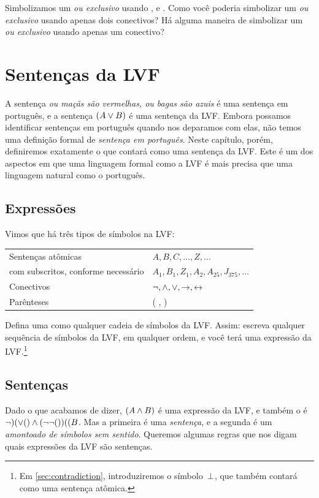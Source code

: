 \problempart
Simbolizamos um \emph{ou exclusivo} usando \eor, \eand e \enot. Como você poderia simbolizar um \emph{ou exclusivo} usando apenas dois conectivos? Há alguma maneira de simbolizar um \emph{ou exclusivo} usando apenas um conectivo?

\chapter{Sentenças da LVF}\label{s:TFLSentences}
A sentença \emph{ou maçãs são vermelhas, ou bagas são azuis} é uma
sentença em português, e a sentença $(A\vee B)$ é uma sentença da LVF.
Embora possamos identificar sentenças em português quando nos deparamos
com elas, não temos uma definição formal de \emph{sentença em português}.
Neste capítulo, porém, definiremos exatamente o que contará como uma
sentença da LVF. Este é um dos aspectos em que uma linguagem formal como
a LVF é mais precisa que uma linguagem natural como o português.


\section{Expressões}

Vimos que há três tipos de símbolos na LVF:
\begin{center}
\begin{tabular}{l l}
Sentenças atômicas & $A,B,C,\ldots,Z,\ldots$\\
com subscritos, conforme necessário & $A_1, B_1,Z_1,A_2,A_{25},J_{375},\ldots$\\[12pt]
Conectivos & $\neg,\wedge,\vee,\rightarrow,\leftrightarrow$\\[12pt]
Parênteses &( , )
\end{tabular}
\end{center}
Defina uma  como qualquer cadeia de símbolos
da LVF.
Assim: escreva qualquer sequência de símbolos da LVF, em qualquer ordem,
e você terá uma expressão da LVF.\footnote{Em \cref{sec:contradiction},
introduziremos o símbolo~$\bot$, que também contará como uma sentença
atômica.}

\section{Sentenças}\label{s:Sentences}
Dado o que acabamos de dizer, $(A \wedge B)$ é uma expressão da LVF, e
também o é $\lnot)(\vee()\wedge(\neg\neg())((B$. Mas a primeira é uma
\emph{sentença}, e a segunda é um \emph{amontoado de símbolos sem
sentido}. Queremos algumas regras que nos digam quais expressões da LVF
são sentenças.

